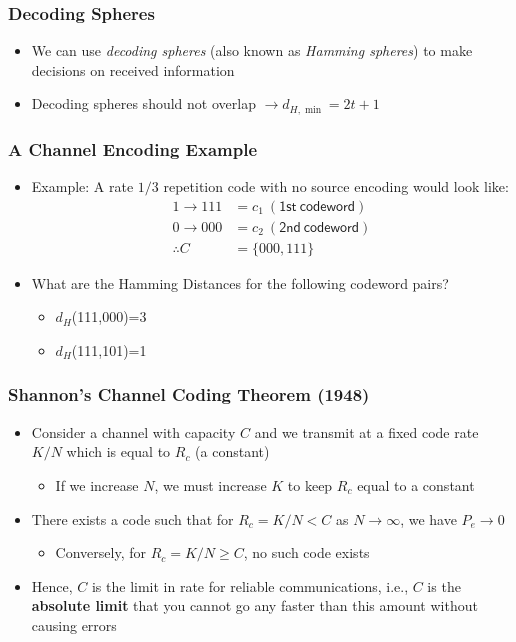\documentclass[10pt]{beamer}
\begin{document}
\frame
{
  \frametitle{Decoding Spheres}

  \begin{itemize}
    \item We can use {\it decoding spheres} (also known as {\it Hamming spheres}) to make decisions on received information
    \item Decoding spheres should not overlap $\rightarrow{d_{H,\min}}=2t+1$
  \end{itemize}

}
\frame
{
  \frametitle{A Channel Encoding Example}

    \begin{itemize}
        \item Example: A rate $1/3$ repetition code with no source encoding would look like:
        \begin{equation}
        \begin{split}
            1\rightarrow{111}&={c_{1}}~(\mathsf{1st~codeword})\\
            0\rightarrow{000}&={c_{2}}~(\mathsf{2nd~codeword})\\
            \therefore{C}&=\{000,111\}
        \end{split}
        \end{equation}
       \item What are the Hamming Distances for the following codeword pairs?
            \begin{itemize}
            \item $d_{H}$(111,000)=3
            \item $d_{H}$(111,101)=1
            \end{itemize}
    \end{itemize}

}
\frame
{
  \frametitle{Shannon's Channel Coding Theorem (1948)}

  \begin{itemize}
  \item Consider a channel with capacity $C$ and we transmit at a fixed code rate $K/N$ which is equal to $R_c$ (a constant)
  \begin{itemize}
    \item If we increase $N$, we must increase $K$ to keep $R_c$ equal to a constant
  \end{itemize}
  \item There exists a code such that for $R_c=K/N<C$ as $N\rightarrow\infty$, we have $P_e\rightarrow{0}$
  \begin{itemize}
    \item Conversely, for $R_c=K/N \geq C$, no such code exists
  \end{itemize}
  \item Hence, $C$ is the limit in rate for reliable communications, i.e., $C$ is the {\bf absolute limit} that you cannot go any faster than this amount without causing errors
  \end{itemize}
}
\end{document}
